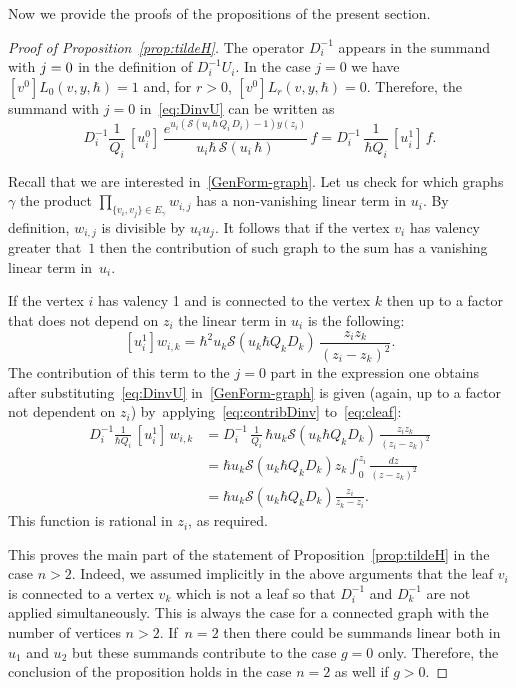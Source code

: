 \documentclass[11pt]{article}
\let\mathcal\mathscr
\theoremstyle{plain}
\theoremstyle{definition}
\theoremstyle{remark}
\newcommand{\cS}{\mathcal{S}}
\begin{document}
Now we provide the proofs of the propositions of the present section.
\begin{proof}[Proof of Proposition~\ref{prop:tildeH}]
The operator $D_{i}^{-1}$ appears in the summand with $j=\nobreak0$ in the definition of $D_i^{-1}U_i$. In the case $j=0$ we have $[v^0]L_0(v,y,\hbar)=1$ and, for $r>0$, $[v^0]L_r(v,y,\hbar)=0$. Therefore, the summand with $j=0$ in~\eqref{eq:DinvU} can be written as
\begin{equation}\label{eq:contribDinv}
D_i^{-1}\frac{1}{Q_i}\,
[u_i^0]\, \frac{e^{u_i(\cS(u_i\,\hbar\,Q_i\,D_i)-1)y(z_i)}}{u_i\hbar\,\cS(u_i\,\hbar)}\,f=
D_{i}^{-1}\,\frac{1}{\hbar Q_i}\,[u_i^1]\,f.
\end{equation}

Recall that we are interested in~\eqref{GenForm-graph}.
Let us check for which graphs~$\gamma$ the product $\prod_{\{v_i,v_j\}\in E_\gamma} w_{i,j}$ has a non-vanishing linear term in $u_i$. By definition, $w_{i,j}$ is divisible by $u_iu_j$. It follows that if the vertex $v_i$ has valency greater that~$1$ then the contribution of such graph to the sum has a vanishing linear term in~$u_i$.

If the vertex $i$ has valency 1 and is connected to the vertex $k$ then up to a factor that does not depend on $z_i$ the linear term in $u_i$ is the following:
\begin{equation}\label{eq:cleaf}
[u_i^1]w_{i,k} = \hbar^2 u_k \cS(u_k\hbar Q_kD_k)\,\frac{z_iz_k}{(z_i-z_k)^2}.
\end{equation}
The contribution of this term to the $j=0$ part in the expression one obtains after substituting~\eqref{eq:DinvU} in~\eqref{GenForm-graph} is given (again, up to a factor not dependent on $z_i$) by~applying~\eqref{eq:contribDinv} to~\eqref{eq:cleaf}:
\begin{equation} \label{eq:leafexpr}
\begin{aligned}
D_{i}^{-1}\frac{1}{\hbar Q_i}\,[u_i^1]\,w_{i,k}
&=D_{i}^{-1}\,\frac{1}{Q_i}\,\hbar u_k \cS(u_k\hbar Q_kD_k)\,\frac{z_iz_k}{(z_i-z_k)^2}\\
&=\hbar u_k \cS(u_k\hbar Q_kD_k)z_k\int_0^{z_i}\frac{dz}{(z-z_k)^2}
\\
& =\hbar u_k \cS(u_k\hbar Q_kD_k)\frac{z_i}{z_k-z_i}.
\end{aligned}
\end{equation}
This function is rational in $z_i$, as required.

This proves the main part of the statement of Proposition~\ref{prop:tildeH} in the case $n>2$. Indeed, we assumed implicitly in the above arguments that the leaf $v_i$ is connected to a vertex $v_k$ which is not a leaf so that $D_i^{-1}$ and $D_k^{-1}$ are not applied simultaneously. This is always the case for a connected graph with the number of vertices $n>2$. If~$n=2$ then there could be summands linear both in $u_1$ and $u_2$ but these summands contribute to the case $g=0$ only. Therefore, the conclusion of the proposition holds in the case $n=2$ as well if $g>0$.


\end{proof}
\end{document}
